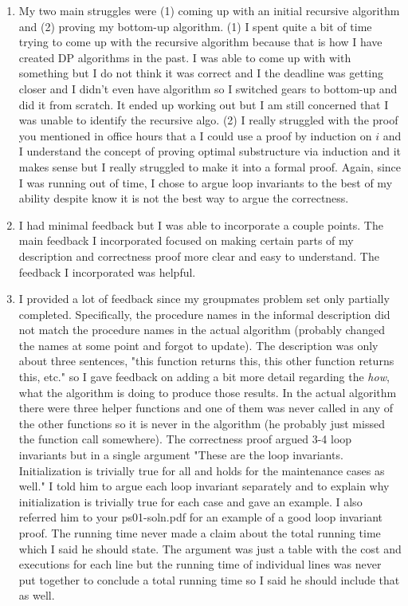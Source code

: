 \documentclass[11pt]{article}
\theoremstyle{nonumberplain}
\begin{document}
\begin{enumerate}
\item My two main struggles were (1) coming up with an initial recursive algorithm and (2) proving my bottom-up algorithm. (1) I spent quite a bit of time trying to come up with the recursive algorithm because that is how I have created DP algorithms in the past. I was able to come up with with something but I do not think it was correct and I the deadline was getting closer and I didn't even have algorithm so I switched gears to bottom-up and did it from scratch. It ended up working out but I am still concerned that I was unable to identify the recursive algo. (2) I really struggled with the proof you mentioned in office hours that a I could use a proof by induction on $i$ and I understand the concept of proving optimal substructure via induction and it makes sense but I really struggled to make it into a formal proof. Again, since I was running out of time, I chose to argue loop invariants to the best of my ability despite know it is not the best way to argue the correctness.
\item I had minimal feedback but I was able to incorporate a couple points. The main feedback I incorporated focused on making certain parts of my description and correctness proof more clear and easy to understand. The feedback I incorporated was helpful.
\item I provided a lot of feedback since my groupmates problem set only partially completed. Specifically, the procedure names in the informal description did not match the procedure names in the actual algorithm (probably changed the names at some point and forgot to update). The description was only about three sentences, "this function returns this, this other function returns this, etc." so I gave feedback on adding a bit more detail regarding the \emph{how}, what the algorithm is doing to produce those results. In the actual algorithm there were three helper functions and one of them was never called in any of the other functions so it is never in the algorithm (he probably just missed the function call somewhere). The correctness proof argued 3-4 loop invariants but in a single argument "These are the loop invariants. Initialization is trivially true for all and holds for the maintenance cases as well." I told him to argue each loop invariant separately and to explain why initialization is trivially true for each case and gave an example. I also referred him to your ps01-soln.pdf for an example of a good loop invariant proof. The running time never made a claim about the total running time which I said he should state. The argument was just a table with the cost and executions for each line but the running time of individual lines was never put together to conclude a total running time so I said he should include that as well.  

\end{enumerate}
\end{document}
